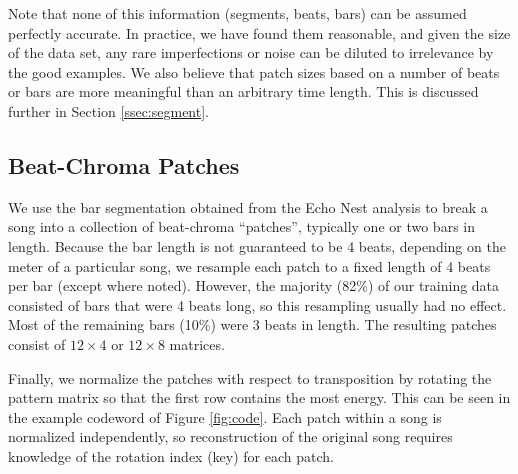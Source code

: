 \documentclass{article}
\newcommand{\eg}{e.g.~}
\begin{document}
Note that none of this information (segments, beats, bars)
can be assumed perfectly accurate.
In practice, we have found them reasonable, 
and given the size of the data set, any rare imperfections or noise
can be diluted to irrelevance by the good examples.  
We also believe that patch sizes based on a number of beats or bars are more
meaningful than an arbitrary time length. This is discussed further in 
Section \ref{ssec:segment}.


\subsection{Beat-Chroma Patches} \label{ssec:beatpatch}

We use the bar segmentation obtained from the Echo Nest analysis to
break a song into a collection of beat-chroma ``patches'', typically
one or two bars in length.
%
Because the bar length is not guaranteed to be 4 beats, 
depending on the meter of a particular
song, we resample each patch to a fixed length of 4 beats
per bar (except where noted).  However, the majority (82\%) of our training data
consisted of bars that were 4 beats long, so this resampling 
usually had no effect.  Most of the remaining bars (10\%) were 3 beats in
length.
The resulting patches consist of $12 \times 4$ or $12 \times 8$ matrices.

Finally, we normalize the patches with respect to transposition by rotating
the pattern matrix so that the first row contains the most
energy. This can be seen in the example codeword of Figure \ref{fig:code}.
Each patch within a song is normalized independently, so
reconstruction of the original song requires knowledge of the
rotation index (key) for each patch.
\end{document}
